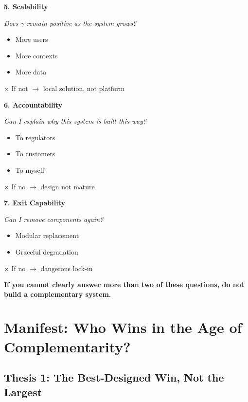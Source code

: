 \begin{tcolorbox}[colback=yellow!5!white, colframe=yellow!75!black,
    title=The Seven Questions]
\vspace{0.5em}
\textbf{5. Scalability}

\textit{Does $\gamma$ remain positive as the system grows?}
\begin{itemize}[nosep]
    \item More users
    \item More contexts
    \item More data
\end{itemize}
$\times$ If not $\rightarrow$ local solution, not platform

\vspace{0.5em}
\textbf{6. Accountability}

\textit{Can I explain why this system is built this way?}
\begin{itemize}[nosep]
    \item To regulators
    \item To customers
    \item To myself
\end{itemize}
$\times$ If no $\rightarrow$ design not mature

\vspace{0.5em}
\textbf{7. Exit Capability}

\textit{Can I remove components again?}
\begin{itemize}[nosep]
    \item Modular replacement
    \item Graceful degradation
\end{itemize}
$\times$ If no $\rightarrow$ dangerous lock-in

\end{tcolorbox}

\begin{tcolorbox}[colback=red!5!white, colframe=red!75!black,
    title=Golden Rule]
\textbf{If you cannot clearly answer more than two of these questions,
do not build a complementary system.}
\end{tcolorbox}


\section{Manifest: Who Wins in the Age of Complementarity?}
\label{sec:thermo-manifest}

\subsection{Thesis 1: The Best-Designed Win, Not the Largest}

